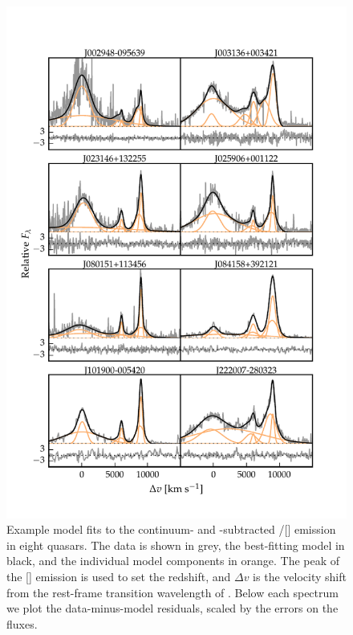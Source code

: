 \begin{figure}
    \centering
    \includegraphics[width=\textwidth]{figures/chapter04/example_spectrum_grid.pdf} 
    \caption[{Model fits to the continuum- and -subtracted \hbns/[] emission in eight quasars.}]{Example model fits to the continuum- and -subtracted \hbns/[] emission in eight quasars. The data is shown in grey, the best-fitting model in black, and the individual model components in orange. The peak of the [] emission is used to set the redshift, and $\Delta{v}$ is the velocity shift from the rest-frame transition wavelength of \hbns. Below each spectrum we plot the data-minus-model residuals, scaled by the errors on the fluxes.}     
    \label{fig:example_spectrum_grid}
\end{figure}

